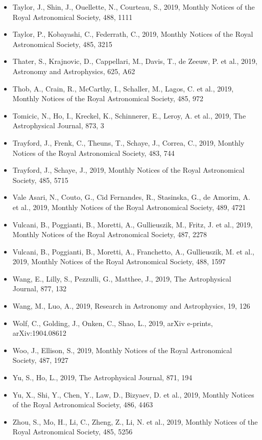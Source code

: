 \documentclass{letter}
\begin{document}
\begin{enumerate}
\begin{itemize}
\item Taylor, J., Shin, J., Ouellette, N., Courteau, S., 2019, Monthly Notices of the Royal Astronomical Society, 488, 1111
\item Taylor, P., Kobayashi, C., Federrath, C., 2019, Monthly Notices of the Royal Astronomical Society, 485, 3215
\item Thater, S., Krajnovic, D., Cappellari, M., Davis, T., de Zeeuw, P. et al., 2019, Astronomy and Astrophysics, 625, A62
\item Thob, A., Crain, R., McCarthy, I., Schaller, M., Lagos, C. et al., 2019, Monthly Notices of the Royal Astronomical Society, 485, 972
\item Tomicic, N., Ho, I., Kreckel, K., Schinnerer, E., Leroy, A. et al., 2019, The Astrophysical Journal, 873, 3
\item Trayford, J., Frenk, C., Theuns, T., Schaye, J., Correa, C., 2019, Monthly Notices of the Royal Astronomical Society, 483, 744
\item Trayford, J., Schaye, J., 2019, Monthly Notices of the Royal Astronomical Society, 485, 5715
\item Vale Asari, N., Couto, G., Cid Fernandes, R., Stasinska, G., de Amorim, A. et al., 2019, Monthly Notices of the Royal Astronomical Society, 489, 4721
\item Vulcani, B., Poggianti, B., Moretti, A., Gullieuszik, M., Fritz, J. et al., 2019, Monthly Notices of the Royal Astronomical Society, 487, 2278
\item Vulcani, B., Poggianti, B., Moretti, A., Franchetto, A., Gullieuszik, M. et al., 2019, Monthly Notices of the Royal Astronomical Society, 488, 1597
\item Wang, E., Lilly, S., Pezzulli, G., Matthee, J., 2019, The Astrophysical Journal, 877, 132
\item Wang, M., Luo, A., 2019, Research in Astronomy and Astrophysics, 19, 126
\item Wolf, C., Golding, J., Onken, C., Shao, L., 2019, arXiv e-prints, arXiv:1904.08612
\item Woo, J., Ellison, S., 2019, Monthly Notices of the Royal Astronomical Society, 487, 1927
\item Yu, S., Ho, L., 2019, The Astrophysical Journal, 871, 194
\item Yu, X., Shi, Y., Chen, Y., Law, D., Bizyaev, D. et al., 2019, Monthly Notices of the Royal Astronomical Society, 486, 4463
\item Zhou, S., Mo, H., Li, C., Zheng, Z., Li, N. et al., 2019, Monthly Notices of the Royal Astronomical Society, 485, 5256

\end{itemize}
\end{enumerate}
\end{document}
